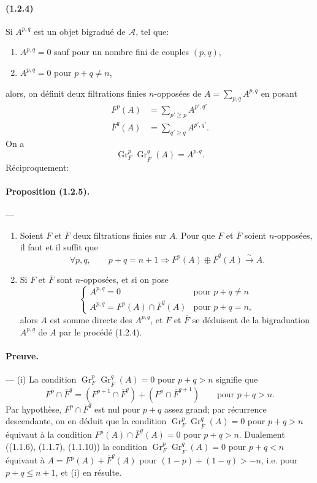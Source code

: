\documentclass[10pt]{article}
\newcommand{\Gr}{\operatorname{Gr}}
\newcommand{\calA}{\mathcal A}
\newcommand{\iso}{\xrightarrow{\sim}}
\begin{document}
\paragraph{(1.2.4)} Si $A^{p,q}$ est un objet bigradué de $\calA$, tel que:
\begin{enumerate}[label=\alph*)]
\item $A^{p,q}=0$ sauf pour un nombre fini de couples $(p,q)$,
\item $A^{p,q}=0$ pour $p+q\ne n$,
\end{enumerate}
alors, on définit deux filtrations finies $n$-opposées de $A=\sum_{p,q}A^{p,q}$ en posant
\begin{align}
F^p(A)&=\sum_{p'\ge p} A^{p',q'} \tag{1.2.4.1}\\
\overline F^q(A)&=\sum_{q'\ge q} A^{p',q'}. \tag{1.2.4.2}
\end{align}
On a
\[
\tag{1.2.4.3}
\Gr_F^p\Gr_{\overline F}^{q}(A)=A^{p,q}.
\]
Réciproquement:

\paragraph{Proposition (1.2.5).} --- \begin{enumerate}[label=(\roman*)]
\item Soient $F$ et $\overline F$ deux filtrations finies sur $A$. Pour que $F$ et $\overline F$ soient $n$-opposées, il faut et il suffit que
\[
\forall p,q,\qquad p+q=n+1\Rightarrow F^p(A)\oplus\overline F^q(A)\iso A.
\]
\item Si $F$ et $\overline F$ sont $n$-opposées, et si on pose
\[
\begin{cases}
A^{p,q}=0 & \text{pour }p+q\ne n\\
A^{p,q}=F^p(A)\cap\overline F^q(A) & \text{pour }p+q=n,
\end{cases}
\]
alors $A$ est somme directe des $A^{p,q}$, et $F$ et $\overline F$ se déduisent de la bigraduation $A^{p,q}$ de $A$ par le procédé (1.2.4).
\end{enumerate}

\paragraph{Preuve.} --- (i) La condition $\Gr_F^p\Gr_{\overline F}^q(A)=0$ pour $p+q>n$ signifie que
\[
F^p\cap\overline F^q=(F^{p+1}\cap\overline F^q)+(F^p\cap\overline F^{q+1})\qquad\text{pour }p+q>n.
\]
Par hypothèse, $F^p\cap\overline F^q$ est nul pour $p+q$ assez grand; par récurrence descendante, on en déduit que la condition $\Gr_F^p\Gr_{\overline F}^q(A)=0$ pour $p+q>n$ équivaut à la condition $F^p(A)\cap\overline F^q(A)=0$ pour $p+q>n$. Dualement ((1.1.6), (1.1.7), (1.1.10)) la condition $\Gr_F^p\Gr_{\overline F}^q(A)=0$ pour $p+q<n$ équivaut à $A=F^p(A)+\overline F^q(A)$ pour $(1-p)+(1-q)>-n$, i.e. pour $p+q\le n+1$, et (i) en résulte.
\end{document}
